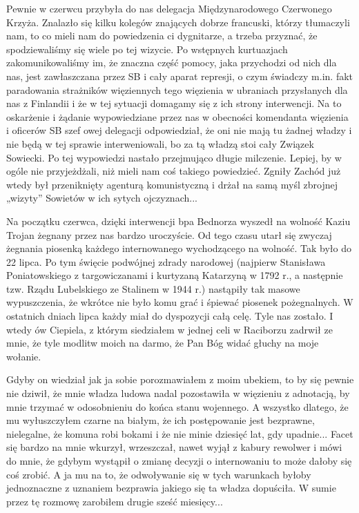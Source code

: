 Pewnie w czerwcu przybyła do nas delegacja Międzynarodowego Czerwonego Krzyża. Znalazło się kilku kolegów znających dobrze francuski, którzy tłumaczyli nam, to co mieli nam do powiedzenia ci dygnitarze, a trzeba przyznać, że spodziewaliśmy się wiele po tej wizycie. Po wstępnych kurtuazjach zakomunikowaliśmy im, że znaczna część pomocy, jaka przychodzi od nich dla nas, jest zawłaszczana przez SB i cały aparat represji, o czym świadczy m.in. fakt paradowania strażników więziennych tego więzienia w ubraniach przysłanych dla nas z Finlandii i że w tej sytuacji domagamy się z ich strony interwencji. Na to oskarżenie i żądanie wypowiedziane przez nas w obecności komendanta więzienia i oficerów SB szef owej delegacji odpowiedział, że oni nie mają tu żadnej władzy i nie będą w tej sprawie interweniowali, bo za tą władzą stoi cały Związek Sowiecki. Po tej wypowiedzi nastało przejmująco długie milczenie. Lepiej, by w ogóle nie przyjeżdżali, niż mieli nam coś takiego powiedzieć. Zgniły Zachód już wtedy był przeniknięty agenturą komunistyczną i drżał na samą myśl zbrojnej „wizyty” Sowietów w ich sytych ojczyznach...

Na początku czerwca, dzięki interwencji bpa Bednorza wyszedł na wolność Kaziu Trojan żegnany przez nas bardzo uroczyście. Od tego czasu utarł się zwyczaj żegnania piosenką każdego internowanego wychodzącego na wolność. Tak było do 22 lipca. Po tym święcie podwójnej zdrady narodowej (najpierw Stanisława Poniatowskiego z targowiczanami i kurtyzaną Katarzyną w 1792 r., a następnie tzw. Rządu Lubelskiego ze Stalinem w 1944 r.) nastąpiły tak masowe wypuszczenia, że wkrótce nie było komu grać i śpiewać piosenek pożegnalnych. W ostatnich dniach lipca każdy miał do dyspozycji całą celę. Tyle nas zostało. I wtedy ów Ciepiela, z którym siedziałem w jednej celi w Raciborzu zadrwił ze mnie, że tyle modlitw moich na darmo, że Pan Bóg widać głuchy na moje wołanie. 

Gdyby on wiedział jak ja sobie porozmawiałem z moim ubekiem, to by się pewnie nie dziwił, że mnie władza ludowa nadal pozostawiła w więzieniu z adnotacją, by mnie trzymać w odosobnieniu do końca stanu wojennego. A wszystko dlatego, że mu wyłuszczyłem czarne na białym, że ich postępowanie jest bezprawne, nielegalne, że komuna robi bokami i że nie minie dziesięć lat, gdy upadnie... Facet się bardzo na mnie wkurzył, wrzeszczał, nawet wyjął z kabury rewolwer i mówi do mnie, że gdybym wystąpił o zmianę  decyzji o internowaniu to może dałoby się coś zrobić. A ja mu na to, że odwoływanie się w tych warunkach byłoby jednoznaczne z uznaniem bezprawia jakiego się ta władza dopuściła. W sumie przez tę rozmowę zarobiłem drugie sześć miesięcy...

